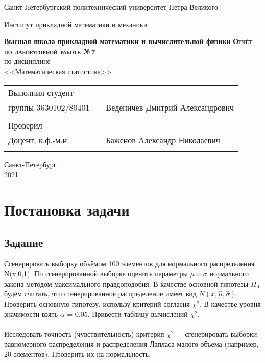 \documentclass{article}
\begin{document}
\begin{titlepage}
  \begin{center}
    \large
    Санкт-Петербургский политехнический университет Петра Великого
    
    Институт прикладной математики и механики
    
    \textbf{Высшая школа прикладной математики и вычислительной физики}
    \vfill
    \textsc{\textbf{\large{Отчёт по лабораторной работе №7}}}\\[5mm]
     по дисциплине\\ <<Математическая статистика>>\\
\end{center}

\vfill

\begin{tabular}{l p{} l}
Выполнил студент \\группы 3630102/80401 && Веденичев Дмитрий Александрович \\
\\
Проверил\\Доцент, к.ф.-м.н.& \hspace{0pt} &   Баженов Александр Николаевич \\\\
\end{tabular}

\hfill \break
\hfill \break
\begin{center} Санкт-Петербург \\2021 \end{center}
\thispagestyle{empty}
\end{titlepage}
\newpage
\newpage
\begin{center}
    \setcounter{page}{2}
    \tableofcontents
\end{center}
\newpage
\begin{center}
    \setcounter{page}{3}
    \listoftables
\end{center}

\newpage

\section {Постановка задачи}
\subsection{Задание}
\noindent Сгенерировать выборку объёмом 100 элементов для нормального распределения N(x,0,1). По сгенерированной выборке оценить параметры $\mu$ и $\sigma$ нормального закона методом максимального правдоподобия. В качестве основной гипотезы $H_{0}$ будем считать, что сгенерированное распределение имеет вид $N(x,\hat{\mu}, \hat{\sigma})$. Проверить основную гипотезу, использу критерий согласия $\chi^{2}$. В качестве уровня значимости взять $\alpha$ = 0.05. Привести таблицу вычислений $\chi^{2}$. 
\\\\
\noindent Исследовать точность (чувствительность) критерия $\chi^{2} - $ сгенерировать выборки равномерного распределения и распределения Лапласа малого объема (например, 20 элементов). Проверить их на нормальность.
\end{document}
